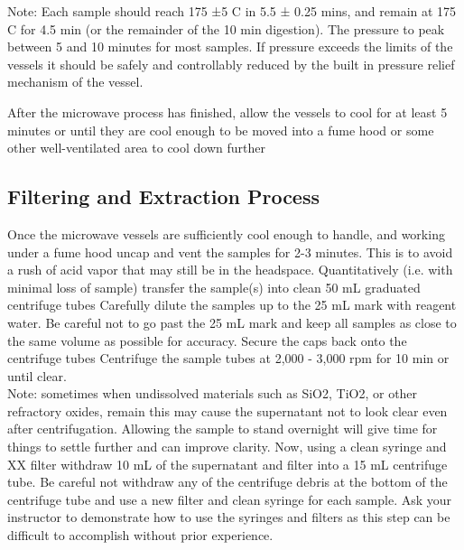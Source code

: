 \documentclass[12pt]{../SOP3_beta}\usepackage[]{graphicx}\usepackage[]{color}
\begin{document}
Note: Each sample should reach 175 ±5 C in 5.5 ± 0.25 mins, and remain at 175 C for 4.5 min (or the remainder of the 10 min digestion). The pressure to peak between 5 and 10 minutes for most samples. If pressure exceeds the limits of the vessels it should be safely and controllably reduced by the built in pressure relief mechanism of the vessel. 

  \NP After the microwave process has finished, allow the vessels to cool for at least 5 minutes or until they are cool enough to be moved into a fume hood or some other well-ventilated area to cool down further %
  
\subsection{Filtering and Extraction Process}

  \NP Once the microwave vessels are sufficiently cool enough to handle, and working under a fume hood uncap and vent the samples for 2-3 minutes. This is to avoid a rush of acid vapor that may still be in the headspace. 
  \NP Quantitatively (i.e. with minimal loss of sample) transfer the sample(s) into clean 50 mL graduated centrifuge tubes 
  \NP Carefully dilute the samples up to the 25 mL mark with reagent water. Be careful not to go past the 25 mL mark and keep all samples as close to the same volume as possible for accuracy. %
  \NP Secure the caps back onto the centrifuge tubes
  \NP Centrifuge the sample tubes at 2,000 - 3,000 rpm for 10 min or until clear. \vspace{4mm} \\
  Note: sometimes when undissolved materials such as SiO2, TiO2, or other refractory oxides, remain this may cause the supernatant not to look clear even after centrifugation. Allowing the sample to stand overnight will give time for things to settle further and can improve clarity. 
  \NP Now, using a clean syringe and XX filter withdraw 10 mL of the supernatant and filter into a 15 mL centrifuge tube. Be careful not withdraw any of the centrifuge debris at the bottom of the centrifuge tube and use a new filter and clean syringe for each sample.  Ask your instructor to demonstrate how to use the syringes and filters as this step can be difficult to accomplish without prior experience.%
\end{document}
